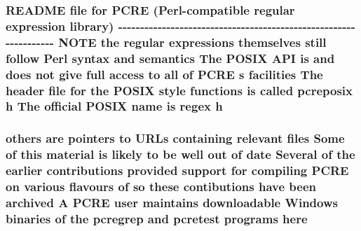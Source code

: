 \subsubsection[{\texorpdfstring{h}{h}}]{\setlength{\rightskip}{0pt plus 5cm}R\+E\+A\+D\+ME {\bf file} for {\bf P\+C\+RE} ({\bf Perl}-\/compatible regular {\bf expression} {\bf library}) -\/-\/-\/-\/-\/-\/-\/-\/-\/-\/-\/-\/-\/-\/-\/-\/-\/-\/-\/-\/-\/-\/-\/-\/-\/-\/-\/-\/-\/-\/-\/-\/-\/-\/-\/-\/-\/-\/-\/-\/-\/-\/-\/-\/-\/-\/-\/-\/-\/-\/-\/-\/-\/-\/-\/-\/-\/-\/-\/-\/-\/-\/-\/-\/-\/ {\bf N\+O\+TE} the regular {\bf expressions} {\bf themselves} {\bf still} follow {\bf Perl} syntax and semantics The P\+O\+S\+IX {\bf A\+PI} {\bf is} and does {\bf not} give full access {\bf to} {\bf all} {\bf of} {\bf P\+C\+RE} {\bf s} facilities The header {\bf file} for the P\+O\+S\+IX {\bf style} {\bf functions} {\bf is} called pcreposix h The official P\+O\+S\+IX {\bf name} {\bf is} {\bf regex} h}\hypertarget{README_8txt_a8d709a45b1ec4f5fc41257dd1ca34e93}{}\label{README_8txt_a8d709a45b1ec4f5fc41257dd1ca34e93}
\subsubsection[{\texorpdfstring{here}{here}}]{\setlength{\rightskip}{0pt plus 5cm}others {\bf are} pointers {\bf to} U\+R\+Ls containing relevant {\bf files} Some {\bf of} {\bf this} material {\bf is} likely {\bf to} {\bf be} well {\bf out} {\bf of} date Several {\bf of} the earlier contributions provided {\bf support} for {\bf compiling} {\bf P\+C\+RE} {\bf on} various flavours {\bf of} {\bf so} these contibutions have been archived {\bf A} {\bf P\+C\+RE} user maintains downloadable {\bf Windows} binaries {\bf of} the pcregrep and {\bf pcretest} programs here}\hypertarget{README_8txt_a6915c99e83a42da0b5cbbbaa928a8195}{}\label{README_8txt_a6915c99e83a42da0b5cbbbaa928a8195}
